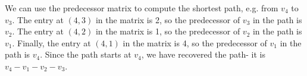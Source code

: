\documentclass[a4paper, openany]{memoir}
\begin{document}
    We can use the predecessor matrix to compute the shortest path, e.g. from $v_4$ to $v_3$. The entry at $(4, 3)$ in the matrix is 2, so the predecessor of $v_3$ in the path is $v_2$. The entry at $(4, 2)$ in the matrix is 1, so the predecessor of $v_2$ in the path is $v_1$. Finally, the entry at $(4, 1)$ in the matrix is 4, so the predecessor of $v_1$ in the path is $v_4$. Since the path starts at $v_4$, we have recovered the path- it is $v_4 - v_1 - v_2 - v_3$.
\end{document}

